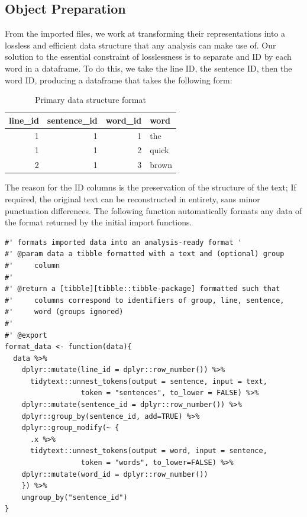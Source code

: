 \documentclass[11pt, a4paper, oneside]{report}
\begin{document}
\subsection{Object Preparation}
\label{sec:org9865b77}
From the imported files, we work at transforming their representations
into a lossless and efficient data structure that any analysis can
make use of. Our solution to the essential constraint of losslessness
is to separate and ID by each word in a dataframe. To do this, we take
the line ID, the sentence ID, then the word ID, producing a dataframe
that takes the following form:

  \begin{table}[h]
    \centering
   
  \begin{tabular}{rrrl}
    line\_id & sentence\_id & word\_id & word\\
    \toprule
    1 & 1 & 1 & the\\
    1 & 1 & 2 & quick\\
    2 & 1 & 3 & brown\\
  \end{tabular}  
  \caption{Primary data structure format}\label{tab:data-base}
\end{table}

The reason for the ID columns is the preservation of the structure of
the text; If required, the original text can be reconstructed in
entirety, sans minor punctuation differences. The following function
automatically formats any data of the format returned by the initial
import functions.

\begin{verbatim}
#' formats imported data into an analysis-ready format '
#' @param data a tibble formatted with a text and (optional) group
#'     column
#'
#' @return a [tibble][tibble::tibble-package] formatted such that
#'     columns correspond to identifiers of group, line, sentence,
#'     word (groups ignored)
#'
#' @export
format_data <- function(data){
  data %>%
    dplyr::mutate(line_id = dplyr::row_number()) %>% 
      tidytext::unnest_tokens(output = sentence, input = text,
			      token = "sentences", to_lower = FALSE) %>%
    dplyr::mutate(sentence_id = dplyr::row_number()) %>%
    dplyr::group_by(sentence_id, add=TRUE) %>%
    dplyr::group_modify(~ {
      .x %>%
	  tidytext::unnest_tokens(output = word, input = sentence,
				  token = "words", to_lower=FALSE) %>%
	dplyr::mutate(word_id = dplyr::row_number())
    }) %>%
    ungroup_by("sentence_id")
}
\end{verbatim}
\end{document}
